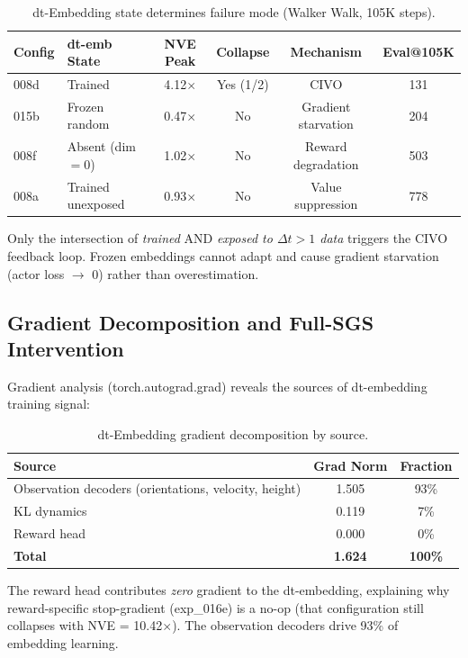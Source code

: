 \documentclass[10pt,letterpaper]{article}
\begin{document}
\begin{table}[h]
\centering
\caption{dt-Embedding state determines failure mode (Walker Walk, 105K steps).}
\label{tab:frozen}
\begin{tabular}{llcccc}
\toprule
Config & dt-emb State & NVE Peak & Collapse & Mechanism & Eval@105K \\
\midrule
008d  & Trained            & 4.12$\times$ & Yes (1/2) & CIVO & 131 \\
015b  & Frozen random      & 0.47$\times$ & No  & Gradient starvation & 204 \\
008f  & Absent (dim$=$0)   & 1.02$\times$ & No  & Reward degradation & 503 \\
008a  & Trained unexposed  & 0.93$\times$ & No  & Value suppression & 778 \\
\bottomrule
\end{tabular}
\end{table}

Only the intersection of \emph{trained} AND \emph{exposed to $\Delta t > 1$ data} triggers the CIVO feedback loop. Frozen embeddings cannot adapt and cause gradient starvation (actor loss $\to$ 0) rather than overestimation.

\subsection{Gradient Decomposition and Full-SGS Intervention}
\label{sec:gradient}

Gradient analysis (torch.autograd.grad) reveals the sources of dt-embedding training signal:

\begin{table}[h]
\centering
\caption{dt-Embedding gradient decomposition by source.}
\label{tab:gradient_decomp}
\begin{tabular}{lcc}
\toprule
Source & Grad Norm & Fraction \\
\midrule
Observation decoders (orientations, velocity, height) & 1.505 & 93\% \\
KL dynamics & 0.119 & 7\% \\
Reward head & 0.000 & 0\% \\
\textbf{Total} & \textbf{1.624} & \textbf{100\%} \\
\bottomrule
\end{tabular}
\end{table}

The reward head contributes \emph{zero} gradient to the dt-embedding, explaining why reward-specific stop-gradient (exp\_016e) is a no-op (that configuration still collapses with NVE = 10.42$\times$). The observation decoders drive 93\% of embedding learning.
\end{document}
